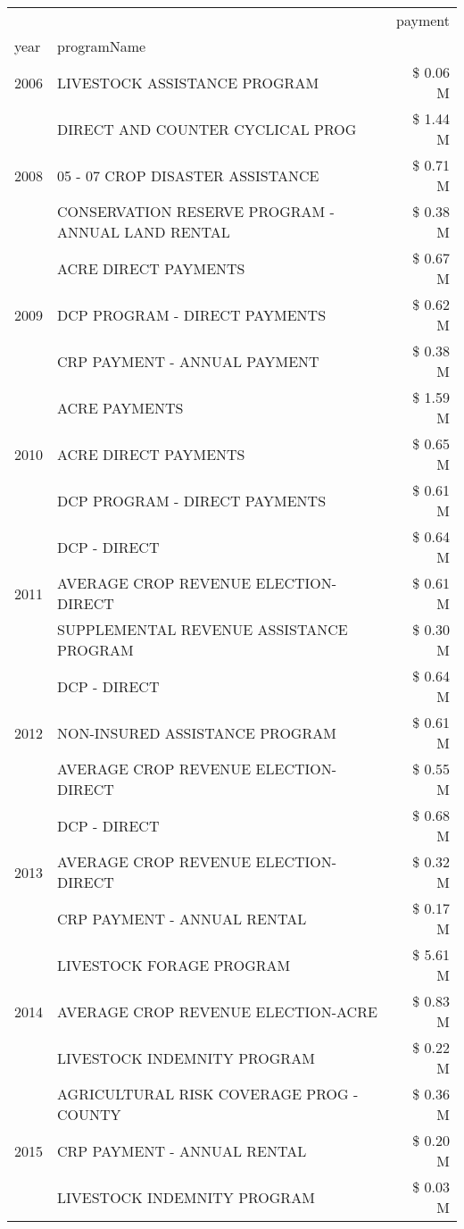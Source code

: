 \begin{tabular}{llr}
\toprule
 &  & payment \\
year & programName &  \\
\midrule
2006 & LIVESTOCK ASSISTANCE PROGRAM & \$ 0.06 M \\
\cline{1-3}
\multirow[t]{3}{*}{2008} & DIRECT AND COUNTER CYCLICAL PROG & \$ 1.44 M \\
 & 05 - 07 CROP DISASTER ASSISTANCE & \$ 0.71 M \\
 & CONSERVATION RESERVE PROGRAM - ANNUAL LAND RENTAL & \$ 0.38 M \\
\cline{1-3}
\multirow[t]{3}{*}{2009} & ACRE DIRECT PAYMENTS & \$ 0.67 M \\
 & DCP PROGRAM - DIRECT PAYMENTS & \$ 0.62 M \\
 & CRP PAYMENT - ANNUAL PAYMENT & \$ 0.38 M \\
\cline{1-3}
\multirow[t]{3}{*}{2010} & ACRE PAYMENTS & \$ 1.59 M \\
 & ACRE DIRECT PAYMENTS & \$ 0.65 M \\
 & DCP PROGRAM - DIRECT PAYMENTS & \$ 0.61 M \\
\cline{1-3}
\multirow[t]{3}{*}{2011} & DCP - DIRECT & \$ 0.64 M \\
 & AVERAGE CROP REVENUE ELECTION-DIRECT & \$ 0.61 M \\
 & SUPPLEMENTAL REVENUE ASSISTANCE PROGRAM & \$ 0.30 M \\
\cline{1-3}
\multirow[t]{3}{*}{2012} & DCP - DIRECT & \$ 0.64 M \\
 & NON-INSURED ASSISTANCE PROGRAM & \$ 0.61 M \\
 & AVERAGE CROP REVENUE ELECTION-DIRECT & \$ 0.55 M \\
\cline{1-3}
\multirow[t]{3}{*}{2013} & DCP - DIRECT & \$ 0.68 M \\
 & AVERAGE CROP REVENUE ELECTION-DIRECT & \$ 0.32 M \\
 & CRP PAYMENT - ANNUAL RENTAL & \$ 0.17 M \\
\cline{1-3}
\multirow[t]{3}{*}{2014} & LIVESTOCK FORAGE PROGRAM & \$ 5.61 M \\
 & AVERAGE CROP REVENUE ELECTION-ACRE & \$ 0.83 M \\
 & LIVESTOCK INDEMNITY PROGRAM & \$ 0.22 M \\
\cline{1-3}
\multirow[t]{3}{*}{2015} & AGRICULTURAL RISK COVERAGE PROG - COUNTY & \$ 0.36 M \\
 & CRP PAYMENT - ANNUAL RENTAL & \$ 0.20 M \\
 & LIVESTOCK INDEMNITY PROGRAM & \$ 0.03 M \\

\end{tabular}
